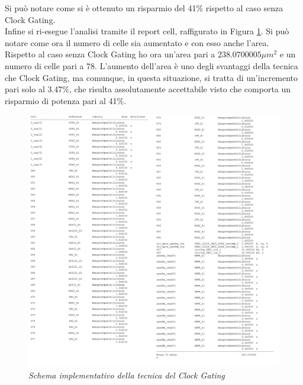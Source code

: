 {Si può notare come si è ottenuto un risparmio del 41\% rispetto al caso senza Clock Gating. \\
Infine si ri-esegue l'analisi tramite il report cell, raffigurato in Figura \ref{3_11}. Si può notare come ora il numero di celle sia aumentato e con esso anche l'area.\\
Rispetto al caso senza Clock Gating ho ora un'area pari a $238.0700005 \mu m^{2}$ e un numero di celle pari a 78. L'aumento dell'area è uno degli svantaggi della tecnica che Clock Gating, ma comunque, in questa situazione, si tratta di un'incremento pari solo al 3.47\%, che risulta assolutamente accettabile visto che comporta un risparmio di potenza pari al 41\%.
\begin{figure}[!htb]
	\centering
	\includegraphics[scale=0.65]{immagini/3_11}
	\caption{\textit{Schema implementativo della tecnica del Clock Gating}}
	\label{3_11}
\end{figure}

}
